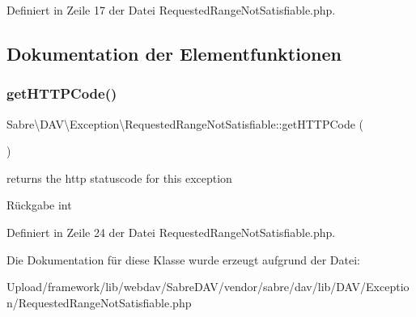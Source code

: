 Definiert in Zeile 17 der Datei Requested\+Range\+Not\+Satisfiable.\+php.



\subsection{Dokumentation der Elementfunktionen}
\mbox{\label{class_sabre_1_1_d_a_v_1_1_exception_1_1_requested_range_not_satisfiable_a28a47a62dbb7c898163799bf5c49b3ac}} 
\subsubsection{\texorpdfstring{get\+H\+T\+T\+P\+Code()}{getHTTPCode()}}
{\footnotesize\ttfamily Sabre\textbackslash{}\+D\+A\+V\textbackslash{}\+Exception\textbackslash{}\+Requested\+Range\+Not\+Satisfiable\+::get\+H\+T\+T\+P\+Code (\begin{DoxyParamCaption}{ }\end{DoxyParamCaption})}

returns the http statuscode for this exception

\begin{DoxyReturn}{Rückgabe}
int 
\end{DoxyReturn}


Definiert in Zeile 24 der Datei Requested\+Range\+Not\+Satisfiable.\+php.



Die Dokumentation für diese Klasse wurde erzeugt aufgrund der Datei\+:\begin{DoxyCompactItemize}
\item 
Upload/framework/lib/webdav/\+Sabre\+D\+A\+V/vendor/sabre/dav/lib/\+D\+A\+V/\+Exception/Requested\+Range\+Not\+Satisfiable.\+php\end{DoxyCompactItemize}
